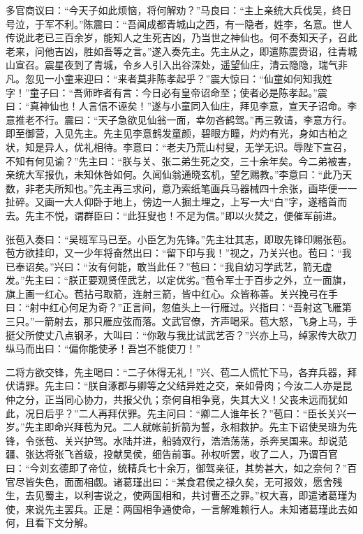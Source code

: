 多官商议曰：“今天子如此烦恼，将何解劝？”马良曰：“主上亲统大兵伐吴，终日号泣，于军不利。”陈震曰：“吾闻成都青城山之西，有一隐者，姓李，名意。世人传说此老已三百余岁，能知人之生死吉凶，乃当世之神仙也。何不奏知天子，召此老来，问他吉凶，胜如吾等之言。”遂入奏先主。先主从之，即遣陈震赍诏，往青城山宣召。震星夜到了青城，令乡人引入出谷深处，遥望仙庄，清云隐隐，瑞气非凡。忽见一小童来迎曰：“来者莫非陈孝起乎？”震大惊曰：“仙童如何知我姓字！”童子曰：“吾师昨者有言：今日必有皇帝诏命至；使者必是陈孝起。”震曰：“真神仙也！人言信不诬矣！”遂与小童同入仙庄，拜见李意，宣天子诏命。李意推老不行。震曰：“天子急欲见仙翁一面，幸勿吝鹤驾。”再三敦请，李意方行。即至御营，入见先主。先主见李意鹤发童颜，碧眼方瞳，灼灼有光，身如古柏之状，知是异人，优礼相待。李意曰：“老夫乃荒山村叟，无学无识。辱陛下宣召，不知有何见谕？”先主曰：“朕与关、张二弟生死之交，三十余年矣。今二弟被害，亲统大军报仇，未知休咎如何。久闻仙翁通晓玄机，望乞赐教。”李意曰：“此乃天数，非老夫所知也。”先主再三求问，意乃索纸笔画兵马器械四十余张，画毕便一一扯碎。又画一大人仰卧于地上，傍边一人掘土埋之，上写一大“白”字，遂稽首而去。先主不悦，谓群臣曰：“此狂叟也！不足为信。”即以火焚之，便催军前进。

张苞入奏曰：“吴班军马已至。小臣乞为先锋。”先主壮其志，即取先锋印赐张苞。苞方欲挂印，又一少年将奋然出曰：“留下印与我！”视之，乃关兴也。苞曰：“我已奉诏矣。”兴曰：“汝有何能，敢当此任？”苞曰：“我自幼习学武艺，箭无虚发。”先主曰：“朕正要观贤侄武艺，以定优劣。”苞令军士于百步之外，立一面旗，旗上画一红心。苞拈弓取箭，连射三箭，皆中红心。众皆称善。关兴挽弓在手曰：“射中红心何足为奇？”正言间，忽值头上一行雁过。兴指曰：“吾射这飞雁第三只。”一箭射去，那只雁应弦而落。文武官僚，齐声喝采。苞大怒，飞身上马，手挺父所使丈八点钢矛，大叫曰：“你敢与我比试武艺否？”兴亦上马，绰家传大砍刀纵马而出曰：“偏你能使矛！吾岂不能使刀！”

二将方欲交锋，先主喝曰：“二子休得无礼！”兴、苞二人慌忙下马，各弃兵器，拜伏请罪。先主曰：“朕自涿郡与卿等之父结异姓之交，亲如骨肉；今汝二人亦是昆仲之分，正当同心协力，共报父仇；奈何自相争竞，失其大义！父丧未远而犹如此，况日后乎？”二人再拜伏罪。先主问曰：“卿二人谁年长？”苞曰：“臣长关兴一岁。”先主即命兴拜苞为兄。二人就帐前折箭为誓，永相救护。先主下诏使吴班为先锋，令张苞、关兴护驾。水陆并进，船骑双行，浩浩荡荡，杀奔吴国来。却说范疆、张达将张飞首级，投献吴侯，细告前事。孙权听罢，收了二人，乃谓百官曰：“今刘玄德即了帝位，统精兵七十余万，御驾亲征，其势甚大，如之奈何？”百官尽皆失色，面面相觑。诸葛瑾出曰：“某食君侯之禄久矣，无可报效，愿舍残生，去见蜀主，以利害说之，使两国相和，共讨曹丕之罪。”权大喜，即遣诸葛瑾为使，来说先主罢兵。正是：两国相争通使命，一言解难赖行人。未知诸葛瑾此去如何，且看下文分解。